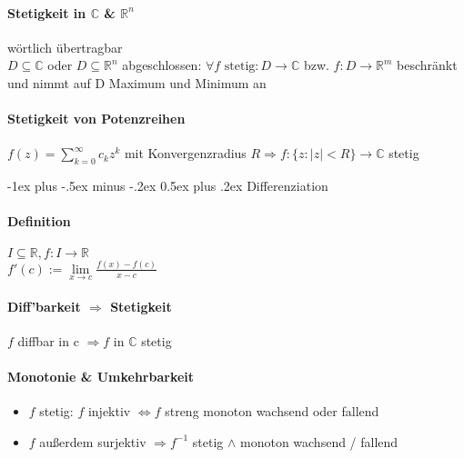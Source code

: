 \documentclass[paper=a3,paper=landscape, fontsize=9pt, DIV=30]{scrartcl}
\makeatletter
\newcommand{\real}{{\mathbb{R}}}
\newcommand{\compl}{\mathbb{C}}
\renewcommand{\section}{\@startsection{section}{1}{0mm}%
  {-1ex plus -.5ex minus -.2ex}%
  {0.5ex plus .2ex}%
  {\color{blue}\normalfont\large\bfseries}}
\makeatother
\begin{document}
\begin{multicols*}{4}
  \paragraph{Stetigkeit in $\compl$ \& $\real ^n$} wörtlich übertragbar\\
  $D \subseteq \compl$ oder $D \subseteq \real^n$ abgeschlossen: $\forall f \text{ stetig}: D \rightarrow \compl$ bzw. $f: D \rightarrow \real^m$ beschränkt und nimmt auf D Maximum und Minimum an

  \paragraph{Stetigkeit von Potenzreihen}
  $ f(z)=\sum_{k=0}^{\infty} c_kz^k$ mit Konvergenzradius $R \Rightarrow f: \{z: \lvert z \rvert < R \} \rightarrow \compl$ stetig


  \section{Differenziation}

  \paragraph{Definition}
  $I \subseteq \real, f: I \rightarrow \real$\\
$f'(c) := \lim\limits_{x \rightarrow c} \frac{f(x)-f(c)}{x-c}$

  \paragraph{Diff'barkeit $\Rightarrow$ Stetigkeit}
  $f$ diffbar in c $\Rightarrow f$ in $\compl$ stetig

  \paragraph{Monotonie \& Umkehrbarkeit}
  \begin{itemize}
  \item $f$ stetig: $f$ injektiv $\Leftrightarrow f$ streng monoton wachsend oder fallend
  \item $f$ außerdem surjektiv $\Rightarrow f^{-1}$ stetig $\wedge$ monoton wachsend / fallend
  \end{itemize}



\end{multicols*}
\end{document}
